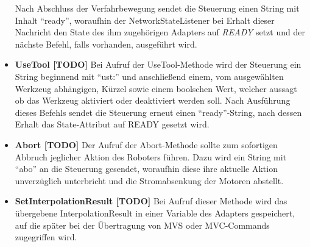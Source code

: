 \begin{itemize}
Nach Abschluss der Verfahrbewegung sendet die Steuerung einen String mit Inhalt “ready”, woraufhin der NetworkStateListener bei Erhalt dieser Nachricht den State des ihm zugehörigen Adapters auf \textit{READY} setzt und der nächste Befehl, falls vorhanden, ausgeführt wird.
\item \textbf{UseTool [TODO]}
\newline
Bei Aufruf der UseTool-Methode wird der Steuerung ein String beginnend mit “ust:” und anschließend einem, vom ausgewählten Werkzeug abhängigen, Kürzel sowie einem boolschen Wert, welcher aussagt ob das Werkzeug aktiviert oder deaktiviert werden soll. Nach Ausführung dieses Befehls sendet die Steuerung erneut einen “ready”-String, nach dessen Erhalt das State-Attribut auf READY gesetzt wird. 
\item \textbf{Abort [TODO]}
\newline
Der Aufruf der Abort-Methode sollte zum sofortigen Abbruch jeglicher Aktion des Roboters führen. Dazu wird ein String mit “abo” an die Steuerung gesendet, woraufhin diese ihre aktuelle Aktion unverzüglich unterbricht und die Stromabsenkung der Motoren abstellt. 
\item \textbf{SetInterpolationResult [TODO]}
\newline
Bei Aufruf dieser Methode wird das übergebene InterpolationResult in einer Variable des Adapters gespeichert, auf die später bei der Übertragung von MVS oder MVC-Commands zugegriffen wird.
\end{itemize}